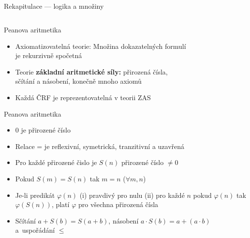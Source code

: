 \documentclass{beamer}
\begin{document}
\begin{frame}{Rekapitulace --- logika a množiny}
\end{frame}

\subsection{}
\begin{frame}{Peanova aritmetika}
\begin{itemize}
\item Axiomatizovatelná teorie: Množina dokazatelných formulí \\ je rekurzivně spočetná
\item Teorie {\bf základní aritmetické síly:} přirozená čísla, \\ sčítání a násobení, konečně mnoho axiomů
\item Každá ČRF je reprezentovatelná v teorii ZAS
\end{itemize}
\begin{block}{Peanova aritmetika}
\begin{itemize}
\item 0 je přirozené číslo
\item Relace = je reflexivní, symetrická, tranzitivní a uzavřená
\item Pro každé přirozené čislo je $S(n)$ přirozené číslo $\ne 0$
\item Pokud $S(m) = S(n)$ tak $m=n$ ($\forall m,n$)
\item Je-li predikát $\varphi(n)$ (i) pravdivý pro nulu (ii) pro každé $n$ pokud $\varphi(n)$ tak $\varphi(S(n))$, platí $\varphi$ pro všechna přirozená čísla
\item Sčítání $a+S(b)=S(a+b)$, násobení $a\cdot S(b) = a + (a\cdot b)$ a~uspořádání $\le$
\end{itemize}
\end{block}
\end{frame}
\end{document}
